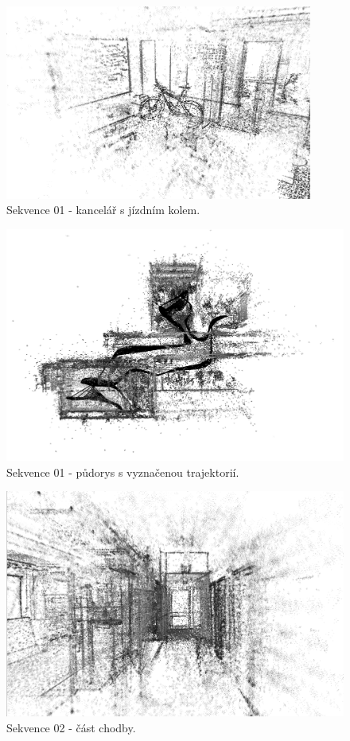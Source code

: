 \documentclass[12pt,a4paper]{article}
\begin{document}
\begin{figure}[H]
\centering
\includegraphics[width=0.9\textwidth]{img/LDSO_01_kolo.png}
\caption{Sekvence 01 - kancelář s jízdním kolem.}
\end{figure}

\begin{figure}[H]
\centering
\includegraphics[width=1\textwidth]{img/LDSO_01_top_b.png}
\caption{Sekvence 01 - půdorys s vyznačenou trajektorií.}
\end{figure}

\begin{figure}[H]
\centering
\includegraphics[width=1\textwidth]{img/LDSO_02_chodba.png}
\caption{Sekvence 02 - část chodby.}
\end{figure}
\end{document}

